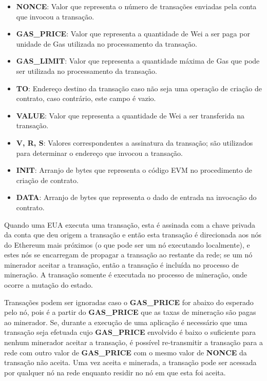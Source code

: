 \documentclass[tcc,capa]{texufpel}
\begin{document}
	\begin{itemize}
	    \item \textbf{NONCE}: Valor que representa o número de transações enviadas pela conta que invocou a transação.
	    \item \textbf{GAS\_PRICE}: Valor que representa a quantidade de Wei a ser paga por unidade de Gas utilizada no processamento da transação.
	    \item \textbf{GAS\_LIMIT}: Valor que representa a quantidade máxima de Gas que pode ser utilizada no processamento da transação.
	    \item \textbf{TO}: Endereço destino da transação caso não seja uma operação de criação de contrato, caso contrário, este campo é vazio.
	    \item \textbf{VALUE}: Valor que representa a quantidade de Wei a ser transferida na transação.
	    \item \textbf{V, R, S}: Valores correspondentes a assinatura da transação; são utilizados para determinar o endereço que invocou a transação.
	    \item \textbf{INIT}: Arranjo de bytes que representa o código EVM no procedimento de criação de contrato.
	    \item \textbf{DATA}: Arranjo de bytes que representa o dado de entrada na invocação do contrato.
	\end{itemize}
	
	Quando uma EUA executa uma transação, esta é assinada com a chave privada da conta que deu origem a transação e então esta transação é direcionada aos nós do Ethereum mais próximos (o que pode ser um nó executando localmente), e estes nós se encarregam de propagar a transação ao restante da rede; se um nó minerador aceitar a transação, então a transação é incluída no processo de mineração. A transação somente é executada no processo de mineração, onde ocorre a mutação do estado.
	
	Transações podem ser ignoradas caso o \textbf{GAS\_PRICE} for abaixo do esperado pelo nó, pois é a partir do \textbf{GAS\_PRICE} que as taxas de mineração são pagas ao minerador. Se, durante a execução de uma aplicação é necessário que uma transação seja efetuada cujo \textbf{GAS\_PRICE} envolvido é baixo o suficiente para nenhum minerador aceitar a transação, é possível re-transmitir a transação para a rede com outro valor de \textbf{GAS\_PRICE} com o mesmo valor de \textbf{NONCE} da transação não aceita. Uma vez aceita e minerada, a transação pode ser acessada por qualquer nó na rede enquanto residir no nó em que esta foi aceita.
	
\end{document}
